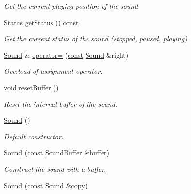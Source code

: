 \begin{DoxyCompactItemize}
\begin{DoxyCompactList}\small\item\em Get the current playing position of the sound. \end{DoxyCompactList}\item 
\hyperlink{classsf_1_1_sound_source_ac43af72c98c077500b239bc75b812f03}{Status} \hyperlink{classsf_1_1_sound_ae8b4084ff8f460b7a2bf9d39e846dab9}{get\-Status} () \hyperlink{term__entry_8h_a57bd63ce7f9a353488880e3de6692d5a}{const} 
\begin{DoxyCompactList}\small\item\em Get the current status of the sound (stopped, paused, playing) \end{DoxyCompactList}\item 
\hyperlink{classsf_1_1_sound}{Sound} \& \hyperlink{classsf_1_1_sound_a08c64c9c1dabeebc59fbf2540d81d4dd}{operator=} (\hyperlink{term__entry_8h_a57bd63ce7f9a353488880e3de6692d5a}{const} \hyperlink{classsf_1_1_sound}{Sound} \&right)
\begin{DoxyCompactList}\small\item\em Overload of assignment operator. \end{DoxyCompactList}\item 
void \hyperlink{classsf_1_1_sound_acb7289d45e06fb76b8292ac84beb82a7}{reset\-Buffer} ()
\begin{DoxyCompactList}\small\item\em Reset the internal buffer of the sound. \end{DoxyCompactList}\item 
\hyperlink{classsf_1_1_sound_a36ab74beaaa953d9879c933ddd246282}{Sound} ()
\begin{DoxyCompactList}\small\item\em Default constructor. \end{DoxyCompactList}\item 
\hyperlink{classsf_1_1_sound_a3b1cfc19a856d4ff8c079ee41bb78e69}{Sound} (\hyperlink{term__entry_8h_a57bd63ce7f9a353488880e3de6692d5a}{const} \hyperlink{classsf_1_1_sound_buffer}{Sound\-Buffer} \&buffer)
\begin{DoxyCompactList}\small\item\em Construct the sound with a buffer. \end{DoxyCompactList}\item 
\hyperlink{classsf_1_1_sound_ae05eeed6377932694d86b3011be366c0}{Sound} (\hyperlink{term__entry_8h_a57bd63ce7f9a353488880e3de6692d5a}{const} \hyperlink{classsf_1_1_sound}{Sound} \&copy)

\end{DoxyCompactItemize}
